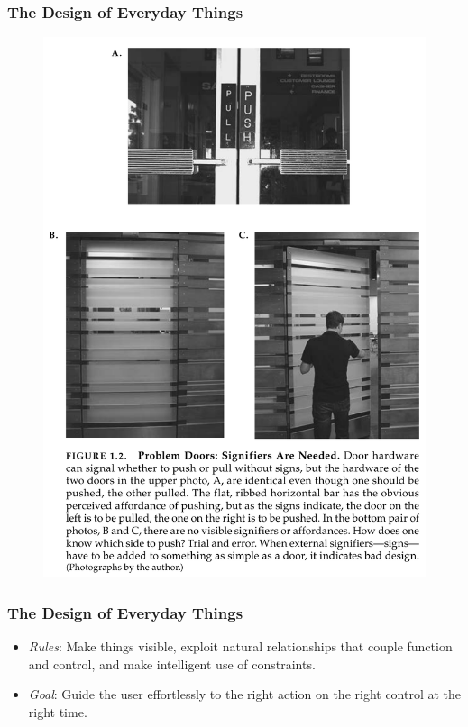 \documentclass[screen, aspectratio=169]{beamer}
\begin{document}
%
\begin{frame}
\frametitle{The Design of Everyday Things}
 \begin{figure}
	\includegraphics[scale=0.23]{img/Donald-Norman-doors.pdf}
    \end{figure}
\end{frame}
%
\begin{frame}
\frametitle{The Design of Everyday Things}
\begin{itemize}
\item \emph{Rules}: Make things visible, exploit natural relationships that couple function and control, and make intelligent use of constraints. 
\item \emph{Goal}: Guide the user effortlessly to the right action on the right control at the right time. 
\end{itemize}
\end{frame}
\end{document}
